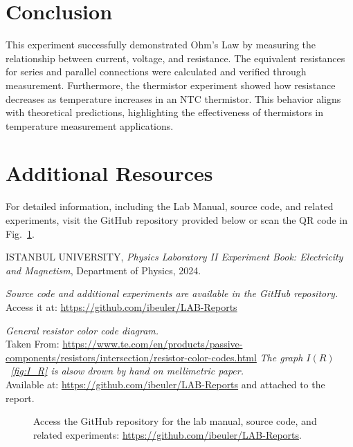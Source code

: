 \documentclass[journal]{IEEEtran}
\begin{document}
\section{Conclusion}
This experiment successfully demonstrated Ohm’s Law by measuring the relationship between current, voltage, and resistance. The equivalent resistances for series and parallel connections were calculated and verified through measurement. Furthermore, the thermistor experiment showed how resistance decreases as temperature increases in an NTC thermistor. This behavior aligns with theoretical predictions, highlighting the effectiveness of thermistors in temperature measurement applications.

\section{Additional Resources}
For detailed information, including the Lab Manual, source code, and related experiments, visit the GitHub repository provided below or scan the QR code in Fig.~\ref{fig:qr}.

\begin{thebibliography}{9}

    ISTANBUL UNIVERSITY, 
    \textit{Physics Laboratory II Experiment Book: Electricity and Magnetism}, 
    Department of Physics, 2024.

    \textit{Source code and additional experiments are available in the GitHub repository.} \\ 
    Access it at: \url{https://github.com/ibeuler/LAB-Reports}

    \textit{General resistor color code diagram.}\\
    Taken From: \url{https://www.te.com/en/products/passive-components/resistors/intersection/resistor-color-codes.html}
    \textit{The graph $I(R)$ ~\ref{fig:I_R} is alsow drown by hand on mellimetric paper.}\\
    Available at: \url{https://github.com/ibeuler/LAB-Reports}
    and attached to the report.
\end{thebibliography}

\begin{figure}[H]
    \centering
    \begin{minipage}{0.15\textwidth}
        \centering
    \end{minipage}%
    \begin{minipage}{0.2\textwidth}
        \raggedright
        \caption{Access the GitHub repository for the lab manual, source code, and related experiments: \href{https://github.com/ibeuler/LAB-Reports}{\url{https://github.com/ibeuler/LAB-Reports}}.}
    \end{minipage}
    \label{fig:qr}
\end{figure}
\end{document}
